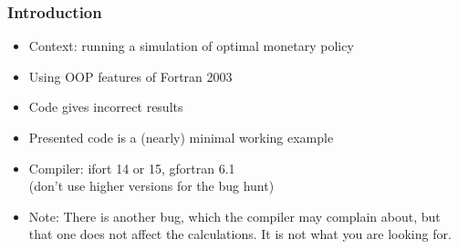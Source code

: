 

\begin{frame}
\frametitle{Introduction}

\begin{itemize}
	\item{Context: running a simulation of optimal monetary policy}
	\item{Using OOP features of Fortran 2003}
	\item{Code gives incorrect results}
	\item{Presented code is a (nearly) minimal working example}
	\item{Compiler: ifort 14 or 15, gfortran 6.1 \\ {\footnotesize (don't use higher versions for the bug hunt)}}
	\item{Note: {\small There is another bug, which the compiler may complain about, but that one does not affect the calculations. It is not what you are looking for.}}
\end{itemize}

\end{frame}

